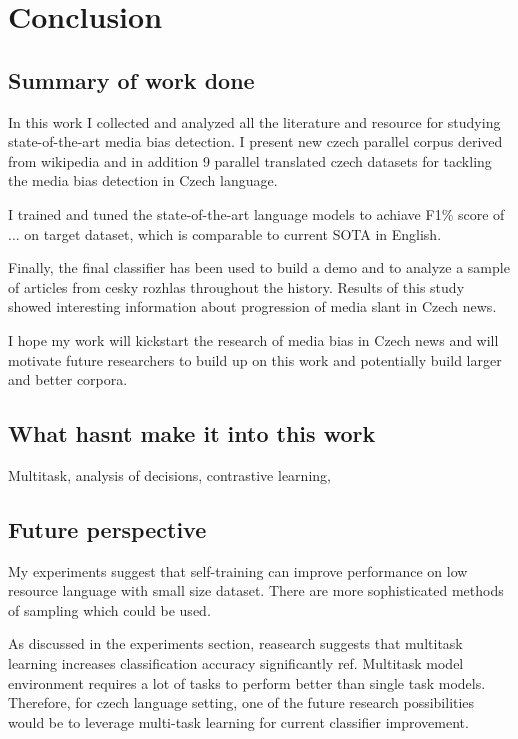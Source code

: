 \chapter{Conclusion}
\section{Summary of work done}
In this work I collected and analyzed all the literature and resource for studying state-of-the-art media bias detection. I present new czech parallel corpus derived from wikipedia and in addition 9 parallel translated czech datasets for tackling the media bias detection in Czech language.

I trained and tuned the state-of-the-art language models to achiave F1\% score of ... on target dataset, which is comparable to current SOTA in English.

Finally, the final classifier has been used to build a demo and to analyze a sample of articles from cesky rozhlas throughout the history. Results of this study showed interesting information about progression of media slant in Czech news.

I hope my work will kickstart the research of media bias in Czech news and will motivate future researchers to build up on this work and potentially build larger and better corpora.

\section{What hasnt make it into this work}
Multitask, analysis of decisions, contrastive learning, 

\section{Future perspective}
My experiments suggest that self-training can improve performance on low resource language with small size dataset. There are more sophisticated methods of sampling which could be used.

As discussed in the experiments section, reasearch suggests that multitask learning increases classification accuracy significantly ref. Multitask model environment requires a lot of tasks \cite{aribandi2021ext5} to perform better than single task models. Therefore, for czech language setting, one of the future research possibilities would be to leverage multi-task learning for current classifier improvement. 